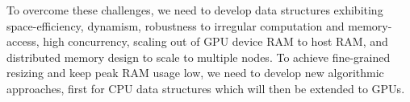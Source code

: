 To overcome these challenges, we need to develop data structures exhibiting space-efficiency, dynamism, robustness to irregular computation and memory-access, high concurrency, scaling out of GPU device RAM to host RAM, and distributed memory design to scale to multiple nodes.
To achieve fine-grained resizing and keep peak RAM usage low, we need to develop new algorithmic approaches, first for CPU data structures which will then be extended to GPUs.





%


